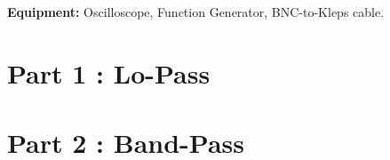 {\Large \textbf{Equipment: }Oscilloscope, Function Generator, BNC-to-Kleps cable.}
\small

\section{Part 1 : Lo-Pass}


\section{Part 2 : Band-Pass}
